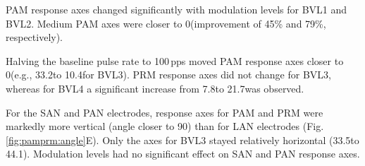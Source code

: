 PAM response axes changed significantly with modulation levels for BVL1 and BVL2. Medium PAM axes were closer to 0\degree (improvement of 45\% and 79\%, respectively). 

Halving the baseline pulse rate to 100\,pps moved PAM response axes closer to 0\degree (e.g., 33.2\degree to 10.4\degree for BVL3). PRM response axes did not change for BVL3, whereas for BVL4 a significant increase from 7.8\degree to 21.7\degree was observed.

	For the SAN and PAN electrodes, response axes for PAM and PRM were markedly more vertical (angle closer to 90\degree) than for LAN electrodes (Fig.\,\ref{fig:pamprm:angle}E). Only the axes for BVL3 stayed relatively horizontal (33.5\degree to 44.1\degree). Modulation levels had no significant effect on SAN and PAN response axes. 

